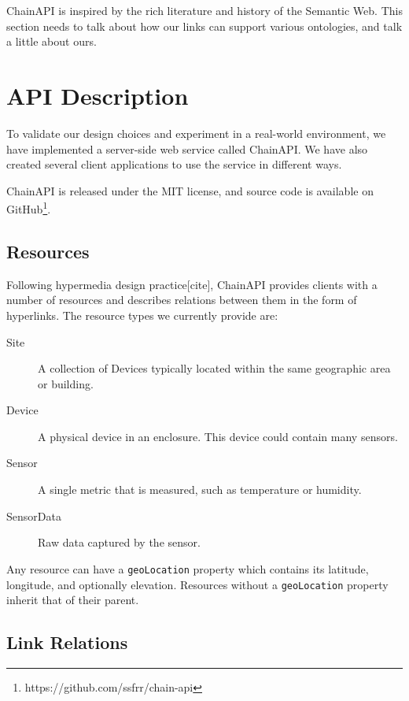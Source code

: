 \documentclass{acm_proc_article-sp}
\begin{document}
ChainAPI is inspired by the rich literature and history of the Semantic Web.
This section needs to talk about how our links can support various ontologies,
and talk a little about ours.

\section{API Description}

To validate our design choices and experiment in a real-world environment, we
have implemented a server-side web service called ChainAPI. We have also
created several client applications to use the service in different ways.

ChainAPI is released under the MIT license, and source code is available on
GitHub\footnote{https://github.com/ssfrr/chain-api}.

\subsection{Resources}

Following hypermedia design practice[cite], ChainAPI provides clients with a
number of resources and describes relations between them in the form of
hyperlinks. The resource types we currently provide are:

\begin{description}
    \item[Site] A collection of Devices typically located within the same
        geographic area or building.
    \item[Device] A physical device in an enclosure. This device could contain
        many sensors.
    \item[Sensor] A single metric that is measured, such as temperature or humidity.
    \item[SensorData] Raw data captured by the sensor.
\end{description}

Any resource can have a \texttt{geoLocation} property which contains its
latitude, longitude, and optionally elevation. Resources without a
\texttt{geoLocation} property inherit that of their parent.

\subsection{Link Relations}
\end{document}
